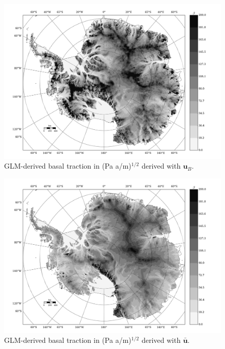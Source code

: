 \begin{figure}
  \centering
  \begin{minipage}[b]{1.00\linewidth}
    \includegraphics[width=1.0\textwidth]{images/antarctica/stats/GLM_beta_U.jpg}
  \end{minipage}
	\caption[]{GLM-derived basal traction in (Pa a/m)$^{1/2}$ derived with $\mathbf{u}_B$.}
\end{figure}


\begin{figure}
  \centering
  \begin{minipage}[b]{1.00\linewidth}
    \includegraphics[width=1.0\textwidth]{images/antarctica/stats/GLM_beta_Ubar.jpg}
  \end{minipage}
	\caption[]{GLM-derived basal traction in (Pa a/m)$^{1/2}$ derived with $\mathbf{\bar{u}}$.}
\end{figure}

